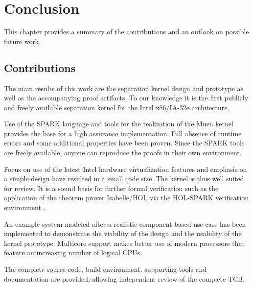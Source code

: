 \chapter{Conclusion}
This chapter provides a summary of the contributions and an outlook on possible
future work.

\section{Contributions}
The main results of this work are the separation kernel design and prototype as
well as the accompanying proof artifacts. To our knowledge it is the first
publicly and freely available separation kernel for the Intel x86/IA-32e
architecture.

Use of the SPARK language and tools for the realization of the Muen kernel
provides the base for a high assurance implementation. Full absence of
runtime errors and some additional properties have been proven. Since the SPARK
tools are freely available, anyone can reproduce the proofs in their own
environment.

Focus on use of the latest Intel hardware virtualization features and emphasis
on a simple design have resulted in a small code size. The kernel is thus well
suited for review. It is a sound basis for further formal verification such as
the application of the theorem prover Isabelle/HOL via the HOL-SPARK
verification environment \cite{berghofer:OASIcs:2012:3587}.

An example system modeled after a realistic component-based use-case has been
implemented to demonstrate the viability of the design and the usability of the
kernel prototype. Multicore support makes better use of modern processors that
feature an increasing number of logical CPUs.

The complete source code, build environment, supporting tools and documentation
are provided, allowing independent review of the complete TCB.



